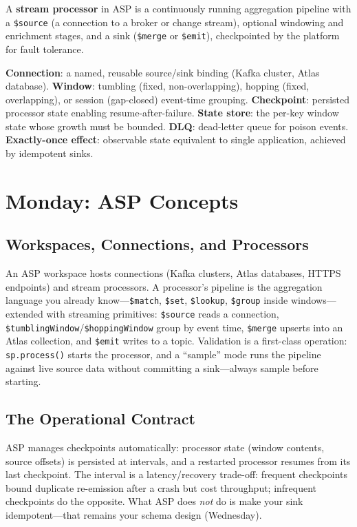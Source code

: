 \begin{definitionbox}
A \textbf{stream processor} in ASP is a continuously running aggregation pipeline with a \texttt{\$source} (a connection to a broker or change stream), optional windowing and enrichment stages, and a sink (\texttt{\$merge} or \texttt{\$emit}), checkpointed by the platform for fault tolerance.
\end{definitionbox}

\begin{keyterms}
\textbf{Connection}: a named, reusable source/sink binding (Kafka cluster, Atlas database). \textbf{Window}: tumbling (fixed, non-overlapping), hopping (fixed, overlapping), or session (gap-closed) event-time grouping. \textbf{Checkpoint}: persisted processor state enabling resume-after-failure. \textbf{State store}: the per-key window state whose growth must be bounded. \textbf{DLQ}: dead-letter queue for poison events. \textbf{Exactly-once effect}: observable state equivalent to single application, achieved by idempotent sinks.
\end{keyterms}

\section{Monday: ASP Concepts}
\subsection{Workspaces, Connections, and Processors}
An ASP workspace hosts connections (Kafka clusters, Atlas databases, HTTPS endpoints) and stream processors. A processor's pipeline is the aggregation language you already know---\texttt{\$match}, \texttt{\$set}, \texttt{\$lookup}, \texttt{\$group} inside windows---extended with streaming primitives: \texttt{\$source} reads a connection, \texttt{\$tumblingWindow}/\texttt{\$hoppingWindow} group by event time, \texttt{\$merge} upserts into an Atlas collection, and \texttt{\$emit} writes to a topic. Validation is a first-class operation: \texttt{sp.process()} starts the processor, and a ``sample'' mode runs the pipeline against live source data without committing a sink---always sample before starting.

\subsection{The Operational Contract}
ASP manages checkpoints automatically: processor state (window contents, source offsets) is persisted at intervals, and a restarted processor resumes from its last checkpoint. The interval is a latency/recovery trade-off: frequent checkpoints bound duplicate re-emission after a crash but cost throughput; infrequent checkpoints do the opposite. What ASP does \emph{not} do is make your sink idempotent---that remains your schema design (Wednesday).

